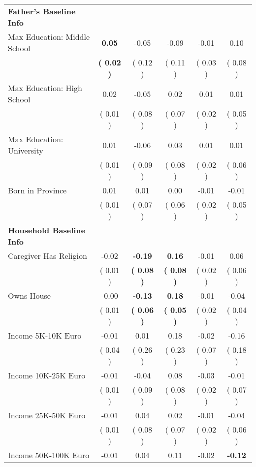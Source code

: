 \begin{table}[H]
{\begin{tabular}{lccccc}
\midrule
\textbf{Father's Baseline Info} \\
\quad Max Education: Middle School & \textbf{     0.05} &     -0.05 &     -0.09 &     -0.01 &      0.10 \\
\quad  & \textbf{(     0.02 )} & (     0.12 )  & (     0.11 )  & (     0.03 ) & (     0.08 ) \\
\quad Max Education: High School &      0.02 &     -0.05 &      0.02 &      0.01 &      0.01 \\
\quad  & (     0.01 ) & (     0.08 )  & (     0.07 )  & (     0.02 ) & (     0.05 ) \\
\quad Max Education: University &      0.01 &     -0.06 &      0.03 &      0.01 &      0.01 \\
\quad  & (     0.01 ) & (     0.09 )  & (     0.08 )  & (     0.02 ) & (     0.06 ) \\
\quad Born in Province &      0.01 &      0.01 &      0.00 &     -0.01 &     -0.01 \\
\quad  & (     0.01 ) & (     0.07 )  & (     0.06 )  & (     0.02 ) & (     0.05 ) \\
\midrule
\textbf{Household Baseline Info} \\
\quad Caregiver Has Religion &     -0.02 & \textbf{    -0.19} & \textbf{     0.16} &     -0.01 &      0.06 \\
\quad  & (     0.01 ) & \textbf{(     0.08 )}  & \textbf{(     0.08 )}  & (     0.02 ) & (     0.06 ) \\
\quad Owns House &     -0.00 & \textbf{    -0.13} & \textbf{     0.18} &     -0.01 &     -0.04 \\
\quad  & (     0.01 ) & \textbf{(     0.06 )}  & \textbf{(     0.05 )}  & (     0.02 ) & (     0.04 ) \\
\quad Income 5K-10K Euro &     -0.01 &      0.01 &      0.18 &     -0.02 &     -0.16 \\
\quad  & (     0.04 ) & (     0.26 )  & (     0.23 )  & (     0.07 ) & (     0.18 ) \\
\quad Income 10K-25K Euro &     -0.01 &     -0.04 &      0.08 &     -0.03 &     -0.01 \\
\quad  & (     0.01 ) & (     0.09 )  & (     0.08 )  & (     0.02 ) & (     0.07 ) \\
\quad Income 25K-50K Euro &     -0.01 &      0.04 &      0.02 &     -0.01 &     -0.04 \\
\quad  & (     0.01 ) & (     0.08 )  & (     0.07 )  & (     0.02 ) & (     0.06 ) \\
\quad Income 50K-100K Euro &     -0.01 &      0.04 &      0.11 &     -0.02 & \textbf{    -0.12} \\

\end{tabular}}
\end{table}

